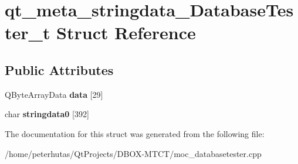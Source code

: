 \hypertarget{structqt__meta__stringdata___database_tester__t}{}\section{qt\+\_\+meta\+\_\+stringdata\+\_\+\+Database\+Tester\+\_\+t Struct Reference}
\label{structqt__meta__stringdata___database_tester__t}
\subsection*{Public Attributes}
\begin{DoxyCompactItemize}
\item 
\mbox{\label{structqt__meta__stringdata___database_tester__t_abd5e5db9be37341d06f627e80d3e54a6}} 
Q\+Byte\+Array\+Data {\bfseries data} \mbox{[}29\mbox{]}
\item 
\mbox{\label{structqt__meta__stringdata___database_tester__t_ab8f72401e9daa07434e23a8f66ef128a}} 
char {\bfseries stringdata0} \mbox{[}392\mbox{]}
\end{DoxyCompactItemize}


The documentation for this struct was generated from the following file\+:\begin{DoxyCompactItemize}
\item 
/home/peterhutas/\+Qt\+Projects/\+D\+B\+O\+X-\/\+M\+T\+C\+T/moc\+\_\+databasetester.\+cpp\end{DoxyCompactItemize}
